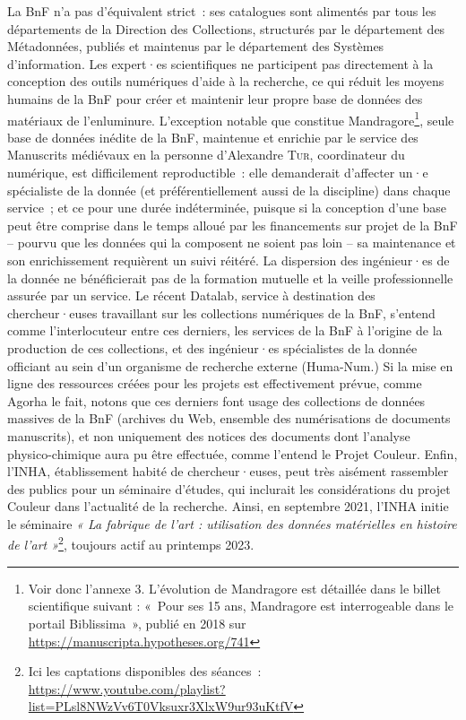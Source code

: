 \documentclass[a4paper,12pt, twoside]{book}
\begin{document}
La BnF n’a pas d’équivalent strict~: ses catalogues sont alimentés par tous les départements de la Direction des Collections, structurés par le département des Métadonnées, publiés et maintenus par le département des Systèmes d’information. Les expert·es scientifiques ne participent pas directement à la conception des outils numériques d’aide à la recherche, ce qui réduit les moyens humains de la BnF pour créer et maintenir leur propre base de données des matériaux de l’enluminure. L’exception notable que constitue Mandragore\footnote{Voir donc l’annexe 3. L’évolution de Mandragore est détaillée dans le billet scientifique suivant : «~Pour ses 15 ans, Mandragore est interrogeable dans le portail Biblissima~», publié en 2018 sur \url{https://manuscripta.hypotheses.org/741}}, seule base de données inédite de la BnF, maintenue et enrichie par le service des Manuscrits médiévaux en la personne d’Alexandre \textsc{Tur}, coordinateur du numérique, est difficilement reproductible~: elle demanderait d’affecter un·e spécialiste de la donnée (et préférentiellement aussi de la discipline) dans chaque service~; et ce pour une durée indéterminée, puisque si la conception d’une base peut être comprise dans le temps alloué par les financements sur projet de la BnF -- pourvu que les données qui la composent ne soient pas loin --  sa maintenance et son enrichissement requièrent un suivi réitéré. La dispersion des ingénieur·es de la donnée ne bénéficierait pas de la formation mutuelle et la veille professionnelle assurée par un service. Le récent Datalab, service à destination des chercheur·euses travaillant sur les collections numériques de la BnF, s’entend comme l’interlocuteur entre ces derniers, les services de la BnF à l’origine de la production de ces collections, et des ingénieur·es spécialistes de la donnée officiant au sein d’un organisme de recherche externe (Huma-Num.) Si la mise en ligne des ressources créées pour les projets est effectivement prévue, comme Agorha le fait, notons que ces derniers font usage des collections de données massives de la BnF (archives du Web, ensemble des numérisations de documents manuscrits), et non uniquement des notices des documents dont l’analyse physico-chimique aura pu être effectuée, comme l’entend le Projet Couleur. Enfin, l’INHA, établissement habité de chercheur·euses, peut très aisément rassembler des publics pour un séminaire d’études, qui inclurait les considérations du projet Couleur dans l’actualité de la recherche. Ainsi, en septembre 2021, l’INHA initie le séminaire \textit{« La fabrique de l'art : utilisation des données matérielles en histoire de l'art »}\footnote{Ici les captations disponibles des séances~: \url{https://www.youtube.com/playlist?list=PLsl8NWzVv6T0Vksuxr3XlxW9ur93uKtfV}}, toujours actif au printemps 2023.
\end{document}
